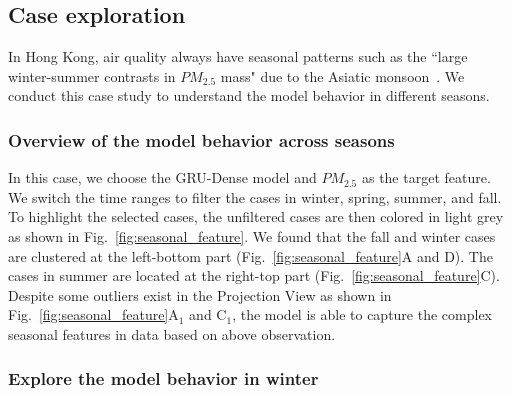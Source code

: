 \subsection{Case exploration}

In Hong Kong, air quality always have seasonal patterns such as the ``large winter-summer contrasts in $PM_{2.5}$ mass" due to the Asiatic monsoon~\cite{louie2005seasonal}. 
We conduct this case study to understand the model behavior in different seasons.  

\subsubsection{Overview of the model behavior across seasons}

In this case, we choose the GRU-Dense model and $PM_{2.5}$ as the target feature.
We switch the time ranges to filter the cases in winter, spring, summer, and fall. 
To highlight the selected cases, the unfiltered cases are then colored in light grey as shown in Fig.~\ref{fig:seasonal_feature}. 
We found that the fall and winter cases are clustered at the left-bottom part (Fig.~\ref{fig:seasonal_feature}A and D). 
The cases in summer are located at the right-top part (Fig.~\ref{fig:seasonal_feature}C).
Despite some outliers exist in the Projection View as shown in Fig.~\ref{fig:seasonal_feature}A$_1$ and C$_1$, the model is able to capture the complex seasonal features in data based on above observation. 

\subsubsection{Explore the model behavior in winter}

